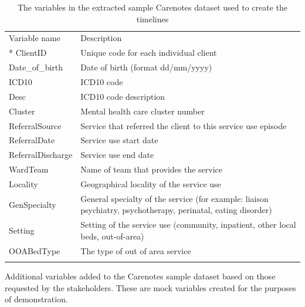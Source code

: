 \documentclass{article}
\begin{document}
\begin{table}[h]
	\centering
	\caption{The variables in the extracted sample Carenotes dataset used to create the timelines}
	\begin{tabular}{
			p{}%
			p{}%
		}
		\toprule
		Variable name & Description
		\tabularnewline*
		\midrule
		ClientID & Unique code for each individual client \\
		Date\_of\_birth & Date of birth (format dd/mm/yyyy) \\
		ICD10 & ICD10 code \\
		Desc & ICD10 code description \\
		Cluster & Mental health care cluster number \\
		ReferralSource & Service that referred the client to this service use episode \\
		ReferralDate & Service use start date \\ 
		ReferralDischarge & Service use end date \\
		WardTeam & Name of team that provides the service \\
		Locality & Geographical locality of the service use \\
		GenSpecialty & General specialty of the service (for example: liaison psychiatry, psychotherapy, perinatal, eating disorder)\\
		Setting & Setting of the service use (community, inpatient, other local beds, out-of-area)\\
		OOABedType & The type of out of area service \\
		\bottomrule
		\label{tab:carenotes_variables}
	\end{tabular}
\end{table}

Additional variables added to the Carenotes sample dataset based on those requested by the stakeholders. These are mock variables created for the purposes of demonstration.
\end{document}

